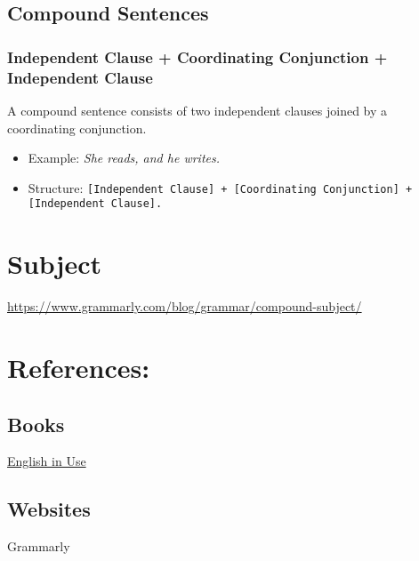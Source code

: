 \documentclass{book}
\begin{document}
\section{Compound Sentences}

\subsection{Independent Clause + Coordinating Conjunction + Independent Clause}
A compound sentence consists of two independent clauses joined by a coordinating conjunction.
\begin{itemize}
	\item Example: \textit{She reads, and he writes.}
	\item Structure: \texttt{[Independent Clause] + [Coordinating Conjunction] + [Independent Clause].}
\end{itemize}

\chapter{Subject}

\url{https://www.grammarly.com/blog/grammar/compound-subject/}

\backmatter

\chapter{References:}

\section{Books}

\href{https://en.wikibooks.org/wiki/English_in_Use}{English in Use}

\section{Websites}

Grammarly

\printindex\label{sec:Index}
\end{document}
